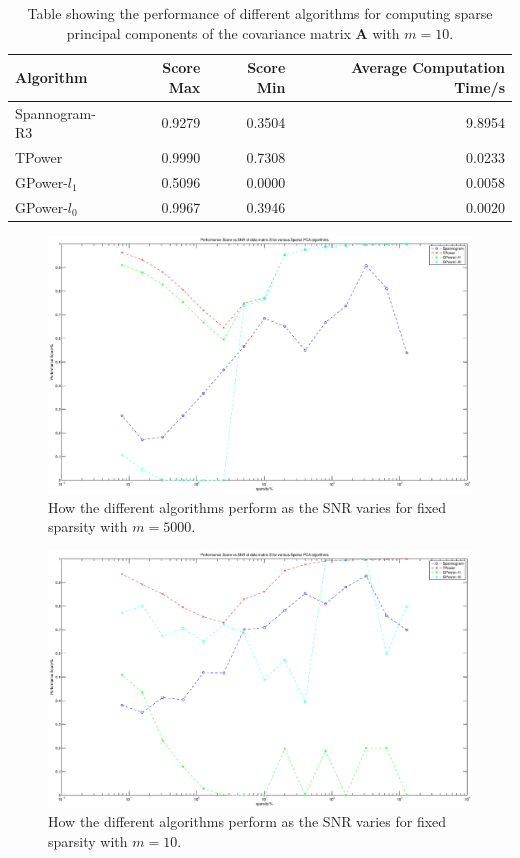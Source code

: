 \documentclass[11pt,a4paper]{article}
\begin{document}
\begin{table}[H]
\center
\begin{tabular}{|l|r|r|r|}
\hline
Algorithm &  Score Max &  Score Min & Average Computation Time/s\\
\hline
Spannogram-R3&       0.9279 &   0.3504 &   9.8954\\
 TPower  &    0.9990  &  0.7308  &  0.0233\\
   GPower-$l_1$&      0.5096       &  0.0000   & 0.0058\\
    GPower-$l_0$&   0.9967    &0.3946 &   0.0020\\
\hline

\end{tabular}
\caption{Table showing the performance of different algorithms for computing sparse principal components of the covariance matrix $\mathbf{A}$ with $m=10$.}
\label{performance_10}
\end{table}

\begin{figure}[H]
\centering
\includegraphics[scale=0.3]{performance_score_vs_snr_5000.eps}
\caption{How the different algorithms perform as the SNR varies for fixed sparsity with $m = 5000$.}
\label{cpev_5000}
\end{figure}

\begin{figure}[H]
\centering
\includegraphics[scale=0.3]{performance_score_vs_snr_10.eps}
\caption{How the different algorithms perform as the SNR varies for fixed sparsity with $m = 10$.}
\label{cpev_10}
\end{figure}
\end{document}
